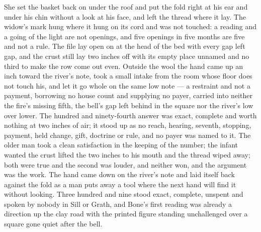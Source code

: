 She set the basket back on  under the roof and put the fold right at his ear and under his chin without a look at his face, and left the thread where it lay. The widow's mark hung where it hung on its cord and was not touched: a reading and a going of the light are not openings, and five openings in five months are five and not a rule. The file lay open on  at the head of the bed with every gap left gap, and the crust still lay two inches off with its empty place unnamed and no third to make the row come out even. Outside the wool the hand came up an inch toward the river's note, took a small intake from the room whose floor does not touch his, and let it go whole on the same low note --- a restraint and not a payment, borrowing no house count and supplying no payer, carried into neither the fire's missing fifth, the bell's gap left behind in the square nor the river's low over lower. The hundred and ninety-fourth answer was exact, complete and worth nothing at two inches of air; it stood up as no reach, hearing, seventh, stopping, payment, held change, gift, doctrine or rule, and no payer was named to it. The older man took a clean satisfaction in the keeping of the number; the infant wanted the crust lifted the two inches to his mouth and the thread wiped away; both were true and the second was louder, and neither won, and the argument was the work. The hand came down on the river's note and laid itself back against the fold as a man puts away a tool where the next hand will find it without looking. Three hundred and nine stood exact, complete, unspent and spoken by nobody in Sill or Grath, and Bone's first reading was already a direction up the clay road with the printed figure standing unchallenged over a square gone quiet after the bell.
